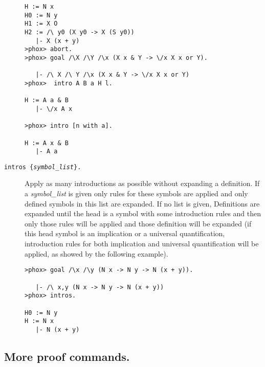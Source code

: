 \begin{description}
\begin{verbatim}
H := N x
H0 := N y
H1 := X O
H2 := /\ y0 (X y0 -> X (S y0))
   |- X (x + y)
>phox> abort.
>phox> goal /\X /\Y /\x (X x & Y -> \/x X x or Y).

   |- /\ X /\ Y /\x (X x & Y -> \/x X x or Y)
>phox>  intro A B a H l.

H := A a & B
   |- \/x A x

>phox> intro [n with a].

H := A x & B
   |- A a
\end{verbatim}

\item[{\tt intros \{{\em symbol\_list}\}.}\idx{intros}]
  
  Apply as many introductions as possible without expanding a definition.  If
  a {\em symbol\_list} is given only rules for these symbols are applied and
  only defined symbols in this list are expanded. If no list is given,
  Definitions are expanded until the head is a symbol with some introduction
  rules and then only those rules will be applied and those definition will be
  expanded (if this head symbol is an implication or a universal
  quantification, introduction rules for both implication and universal
  quantification will be applied, as showed by the following example).

\begin{verbatim}
>phox> goal /\x /\y (N x -> N y -> N (x + y)).

   |- /\ x,y (N x -> N y -> N (x + y))
>phox> intros.

H0 := N y
H := N x
   |- N (x + y)
\end{verbatim}

\end{description}


\subsection{More proof commands.}

